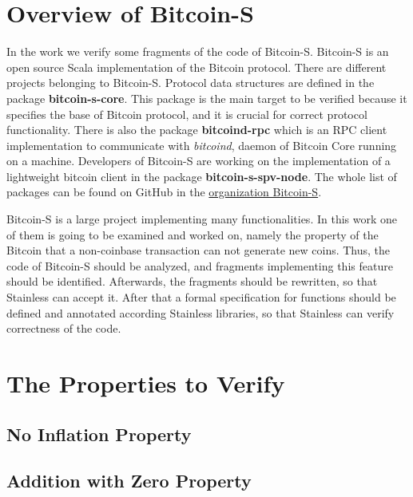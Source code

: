 \section{Overview of Bitcoin-S}
\label{sec:bitcoin_s}

In the work we verify some fragments of the code of Bitcoin-S.
Bitcoin-S is an open source Scala implementation of the Bitcoin protocol. 
There are different projects belonging to Bitcoin-S.
Protocol data structures are defined in the package \textbf{bitcoin-s-core}.
This package is the main target to be verified because it specifies the base of Bitcoin protocol, and it is crucial for correct protocol functionality.
There is also the package \textbf{bitcoind-rpc} which is an RPC client implementation to communicate with \textit{bitcoind}, daemon of Bitcoin Core running on a machine.
Developers of Bitcoin-S are working on the implementation of a lightweight bitcoin client in the package \textbf{bitcoin-s-spv-node}.
The whole list of packages can be found on GitHub in the \href{https://github.com/bitcoin-s}{organization Bitcoin-S}.

Bitcoin-S is a large project implementing many functionalities.
In this work one of them is going to be examined and worked on, namely the property of the Bitcoin that a non-coinbase transaction can not generate new coins.
Thus, the code of Bitcoin-S should be analyzed, and fragments implementing this feature should be identified.
Afterwards, the fragments should be rewritten, so that Stainless can accept it.
After that a formal specification for functions should be defined and annotated according Stainless libraries, so that Stainless can verify correctness of the code.


\section{The Properties to Verify}


\subsection{No Inflation Property}



\subsection{Addition with Zero Property}


